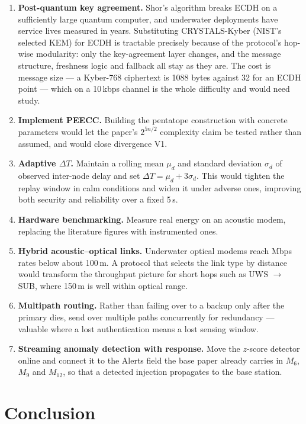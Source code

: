 \begin{enumerate}
\item \textbf{Post-quantum key agreement.} Shor's algorithm breaks ECDH on a sufficiently
      large quantum computer, and underwater deployments have service lives measured in
      years. Substituting CRYSTALS-Kyber (NIST's selected KEM) for ECDH is tractable
      precisely because of the protocol's hop-wise modularity: only the key-agreement layer
      changes, and the message structure, freshness logic and fallback all stay as they are.
      The cost is message size --- a Kyber-768 ciphertext is 1088 bytes against 32 for an
      ECDH point --- which on a 10\,kbps channel is the whole difficulty and would need
      study.
\item \textbf{Implement PEECC.} Building the pentatope construction with concrete parameters
      would let the paper's $2^{5n/2}$ complexity claim be tested rather than assumed, and
      would close divergence V1.
\item \textbf{Adaptive $\Delta T$.} Maintain a rolling mean $\mu_d$ and standard deviation
      $\sigma_d$ of observed inter-node delay and set $\Delta T = \mu_d + 3\sigma_d$. This
      would tighten the replay window in calm conditions and widen it under adverse ones,
      improving both security and reliability over a fixed 5\,s.
\item \textbf{Hardware benchmarking.} Measure real energy on an acoustic modem, replacing
      the literature figures with instrumented ones.
\item \textbf{Hybrid acoustic--optical links.} Underwater optical modems reach Mbps rates
      below about 100\,m. A protocol that selects the link type by distance would transform
      the throughput picture for short hops such as UWS $\to$ SUB, where 150\,m is well
      within optical range.
\item \textbf{Multipath routing.} Rather than failing over to a backup only after the
      primary dies, send over multiple paths concurrently for redundancy --- valuable where
      a lost authentication means a lost sensing window.
\item \textbf{Streaming anomaly detection with response.} Move the $z$-score detector
      online and connect it to the Alerts field the base paper already carries in $M_6$,
      $M_9$ and $M_{12}$, so that a detected injection propagates to the base station.
\end{enumerate}

\section{Conclusion}

